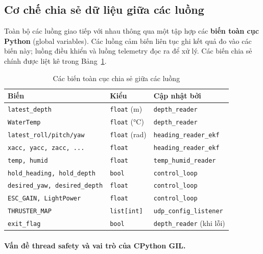 \documentclass[../DoAn.tex]{subfiles}
\begin{document}
\subsection{Cơ chế chia sẻ dữ liệu giữa các luồng}

Toàn bộ các luồng giao tiếp với nhau thông qua một tập hợp các
\textbf{biến toàn cục Python} (global variables). Các luồng cảm biến
liên tục ghi kết quả đo vào các biến này; luồng điều khiển và luồng
telemetry đọc ra để xử lý. Các biến chia sẻ chính được liệt kê trong
Bảng~\ref{tab:shared_vars}.

\begin{table}[H]
\centering
\renewcommand{\arraystretch}{1.3}
\begin{tabular}{|l|l|l|}
\hline
\textbf{Biến} & \textbf{Kiểu} & \textbf{Cập nhật bởi} \\
\hline
\texttt{latest\_depth}             & \texttt{float} (m)          & \texttt{depth\_reader} \\
\texttt{WaterTemp}                 & \texttt{float} (°C)         & \texttt{depth\_reader} \\
\texttt{latest\_roll/pitch/yaw}    & \texttt{float} (rad)        & \texttt{heading\_reader\_ekf} \\
\texttt{xacc, yacc, zacc, ...}     & \texttt{float}              & \texttt{heading\_reader\_ekf} \\
\texttt{temp, humid}               & \texttt{float}              & \texttt{temp\_humid\_reader} \\
\texttt{hold\_heading, hold\_depth} & \texttt{bool}              & \texttt{control\_loop} \\
\texttt{desired\_yaw, desired\_depth} & \texttt{float}           & \texttt{control\_loop} \\
\texttt{ESC\_GAIN, LightPower}     & \texttt{float}              & \texttt{control\_loop} \\
\texttt{THRUSTER\_MAP}             & \texttt{list[int]}          & \texttt{udp\_config\_listener} \\
\texttt{exit\_flag}                & \texttt{bool}               & \texttt{depth\_reader} (khi lỗi) \\
\hline
\end{tabular}
\caption{Các biến toàn cục chia sẻ giữa các luồng}
\label{tab:shared_vars}
\end{table}

\paragraph{Vấn đề thread safety và vai trò của CPython GIL.}
\end{document}
